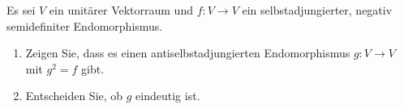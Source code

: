 \documentclass[a4paper, 10pt]{scrartcl}
\begin{document}
\begin{question}[subtitle = Wurzeln aus negativ semidefiniten Endomorphismen]
  Es sei $V$ ein unitärer Vektorraum und $f \colon V \to V$ ein selbstadjungierter, negativ semidefiniter Endomorphismus.
  \begin{enumerate}
    \item
      Zeigen Sie, dass es einen antiselbstadjungierten Endomorphismus $g \colon V \to V$ mit $g^2 = f$ gibt.
    \item
      Entscheiden Sie, ob $g$ eindeutig ist.
  \end{enumerate}
\end{question}
\end{document}
